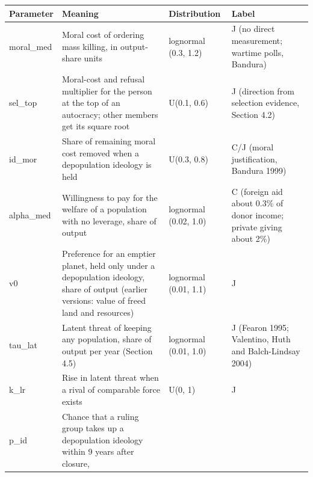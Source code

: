 \documentclass[
  10pt,
]{article}
\newcounter{none} %
\begin{document}
{\def\LTcaptype{none} %
\begin{longtable}[]{@{}
  >{\raggedright\arraybackslash}p{}
  >{\raggedright\arraybackslash}p{}
  >{\raggedright\arraybackslash}p{}
  >{\raggedright\arraybackslash}p{}@{}}
\toprule\noalign{}
\begin{minipage}[b]{\linewidth}\raggedright
Parameter
\end{minipage} & \begin{minipage}[b]{\linewidth}\raggedright
Meaning
\end{minipage} & \begin{minipage}[b]{\linewidth}\raggedright
Distribution
\end{minipage} & \begin{minipage}[b]{\linewidth}\raggedright
Label
\end{minipage} \\
\midrule\noalign{}
\endhead
\bottomrule\noalign{}
\endlastfoot
moral\_med & Moral cost of ordering mass killing, in output-share units & lognormal (0.3, 1.2) & J
(no direct measurement; wartime polls, Bandura) \\
sel\_top & Moral-cost and refusal multiplier for the person at the top of an autocracy; other
members get its square root & U(0.1, 0.6) & J (direction from selection evidence, Section 4.2) \\
id\_mor & Share of remaining moral cost removed when a depopulation ideology is held & U(0.3, 0.8) &
C/J (moral justification, Bandura 1999) \\
alpha\_med & Willingness to pay for the welfare of a population with no leverage, share of output &
lognormal (0.02, 1.0) & C (foreign aid about 0.3\% of donor income; private giving about 2\%) \\
v0 & Preference for an emptier planet, held only under a depopulation ideology, share of output
(earlier versions: value of freed land and resources) & lognormal (0.01, 1.1) & J \\
tau\_lat & Latent threat of keeping any population, share of output per year (Section 4.5) &
lognormal (0.01, 1.0) & J (Fearon 1995; Valentino, Huth and Balch-Lindsay 2004) \\
k\_lr & Rise in latent threat when a rival of comparable force exists & U(0, 1) & J \\
p\_id & Chance that a ruling group takes up a depopulation ideology within 9 years after closure,

\end{longtable}}
\end{document}

